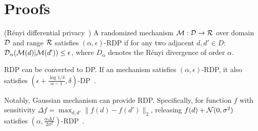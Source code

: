\appendix

\section{Proofs}
\label{sec:proof}

\begin{definition}{\rm (R\'{e}nyi differential privacy~\citep{renyi})} A randomized mechanism ${\mathcal{M}} : {\mathcal{D}} \rightarrow {\mathcal{R}}$ over domain ${\mathcal{D}}$ and
range ${\mathcal{R}}$ satisfies $(\alpha, \epsilon)$-RDP if for any two adjacent $d, d' \in D$: ${\mathcal{D}}_\alpha({\mathcal{M}}(d)|{\mathcal{M}}(d')) \leq \epsilon$, 
where $D_\alpha$ denotes the R\'{e}nyi divergence of order $\alpha$.
\end{definition}

RDP can be converted to DP. If an mechanism satisfies $(\alpha, \epsilon)$-RDP, it also satisfies $(\epsilon + \frac{\log 1/\delta}{\alpha - 1}, \delta)$-DP~\citep{renyi}.

Notably, Gaussian mechanism can provide RDP. Specifically, for function $f$ with sensitivity $\Delta f = \max_{d,d'} \|f(d)-f(d') \|_2$, releasing $f(d) + {\mathcal{N}}(0, \sigma^2)$ satisfies $(\alpha, \frac{\alpha \Delta f}{2\sigma^2})$-RDP~\citep{renyi-gm}.

